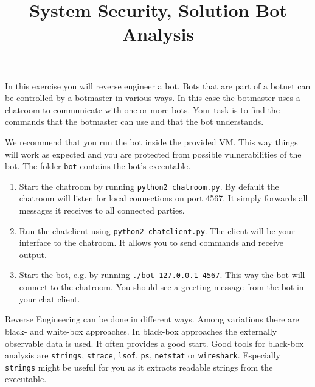 \documentclass[a4paper,11pt]{article}
\title{System Security,
\ifsolution Solution \else \fi
Bot Analysis}
\begin{document}
\maketitle

In this exercise you will reverse engineer a bot. Bots that are part of a botnet
can be controlled by a botmaster in various ways. In this case the botmaster
uses a chatroom to communicate with one or more bots. Your task is to find the
commands that the botmaster can use and that the bot understands. 

We recommend that you run the bot inside the provided VM. This way things will
work as expected and you are protected from possible vulnerabilities of the bot.
The folder \texttt{bot} contains the bot's executable.

\begin{enumerate}
\item Start the chatroom by running \verb|python2 chatroom.py|. By
default the chatroom will listen for local connections on port 4567. It simply
forwards all messages it receives to all connected parties.
\item Run the chatclient using \verb|python2 chatclient.py|. The client will
be your interface to the chatroom. It allows you to send commands and receive
output.
\item Start the bot, e.g. by running \verb|./bot 127.0.0.1 4567|. This way the
bot will connect to the chatroom. You should see a greeting message from the bot
in your chat client.
\end{enumerate}

Reverse Engineering can be done in different ways. Among variations there are
black- and white-box approaches. In black-box approaches the externally
observable data is used. It often provides a good start. Good tools for
black-box analysis are \texttt{strings}, \texttt{strace}, \texttt{lsof},
\texttt{ps}, \texttt{netstat} or \texttt{wireshark}. Especially \texttt{strings}
might be useful for you as it extracts readable strings from the executable.
\end{document}
